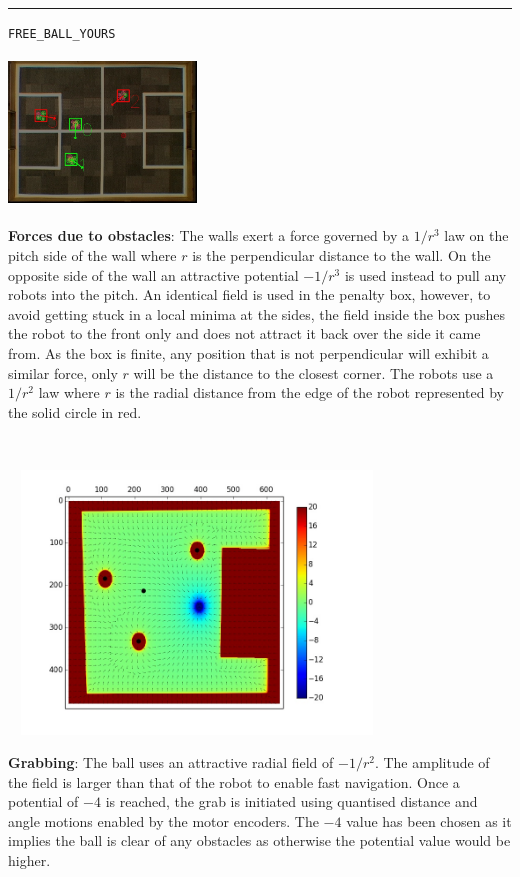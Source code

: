 \documentclass[a4paper,12pt]{article}
\begin{document}
\begin{minipage}{\linewidth}
\rule{\textwidth}{1pt}
\texttt{FREE\_BALL\_YOURS}\medskip

\begin{minipage}{0.5\textwidth}
\begin{center}
\includegraphics[height=40mm,width=50mm]{v3.jpg}\medskip
\end{center}

\textbf{Forces due to obstacles}:
The walls exert a force governed by a $1/r^3$ law on the pitch side of the wall where $r$ is the perpendicular distance to the wall. On the opposite side of the wall an attractive potential $-1/r^3$ is used instead to pull any robots into the pitch. An identical field is used in the penalty box, however, to avoid getting stuck in a local minima at the sides, the field inside the box pushes the robot to the front only and does not attract it back over the side it came from. As the box is finite, any position that is not perpendicular will exhibit a similar force, only $r$ will be the distance to the closest corner. The robots use a $1/r^2$ law where $r$ is the radial distance from the edge of the robot represented by the solid circle in red.
\end{minipage}
~
\begin{minipage}{0.5\textwidth}
\includegraphics[height=70mm,width=100mm,trim=65 55 65 35,clip]{p3.jpg}\medskip

\textbf{Grabbing}: The ball uses an attractive radial field of $-1/r^2$. The amplitude of the field is larger than that of the robot to enable fast navigation. Once a potential of $-4$ is reached, the grab is initiated using quantised distance and angle motions enabled by the motor encoders. The $-4$ value has been chosen as it implies the ball is clear of any obstacles as otherwise the potential value would be higher.
\end{minipage}
\end{minipage}\medskip
\end{document}
